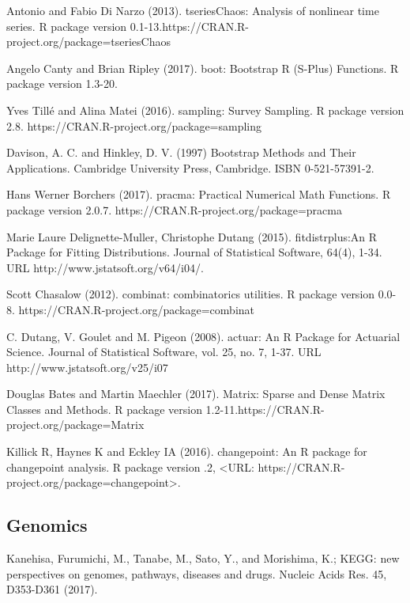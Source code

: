 \documentclass[preprint, 8pt]{elsarticle}
\theoremstyle{definition}
\begin{document}
\begin{thebibliography}{00}
 Antonio and Fabio Di Narzo (2013).
\newblock tseriesChaos: Analysis of nonlinear time series. 
\newblock R package version 0.1-13.https://CRAN.R-project.org/package=tseriesChaos

 Angelo Canty and Brian Ripley (2017). 
\newblock boot: Bootstrap R (S-Plus) Functions. 
\newblock R package version 1.3-20.

Yves Tillé and Alina Matei (2016). 
\newblock sampling: Survey Sampling. 
\newblock R package version 2.8. https://CRAN.R-project.org/package=sampling

 Davison, A. C. and Hinkley, D. V. (1997) 
\newblock Bootstrap Methods and Their Applications. 
\newblock Cambridge University Press, Cambridge. ISBN 0-521-57391-2.

Hans Werner Borchers (2017). 
\newblock pracma: Practical Numerical Math Functions. 
\newblock R package version 2.0.7. https://CRAN.R-project.org/package=pracma

Marie Laure Delignette-Muller, Christophe Dutang (2015). 
\newblock fitdistrplus:An R Package for Fitting Distributions. 
\newblock Journal of Statistical Software, 64(4), 1-34. URL http://www.jstatsoft.org/v64/i04/.

 Scott Chasalow (2012). 
\newblock combinat: combinatorics utilities. 
\newblock R package version 0.0-8. https://CRAN.R-project.org/package=combinat

 C. Dutang, V. Goulet and M. Pigeon (2008). 
\newblock actuar: An R Package for Actuarial Science. 
\newblock Journal of Statistical Software, vol. 25, no. 7, 1-37. URL http://www.jstatsoft.org/v25/i07

 Douglas Bates and Martin Maechler (2017). 
\newblock Matrix: Sparse and Dense Matrix Classes and Methods. 
\newblock R package version 1.2-11.https://CRAN.R-project.org/package=Matrix

 Killick R, Haynes K and Eckley IA (2016).
\newblock changepoint: An R package for changepoint analysis. R package version
.2, <URL: https://CRAN.R-project.org/package=changepoint>.

\subsection{Genomics}

 Kanehisa, Furumichi, M., Tanabe, M., Sato, Y., and Morishima, K.; 
\newblock KEGG: new perspectives on genomes, pathways, diseases and drugs. 
\newblock Nucleic Acids Res. 45, D353-D361 (2017).


\end{thebibliography}
\end{document}
